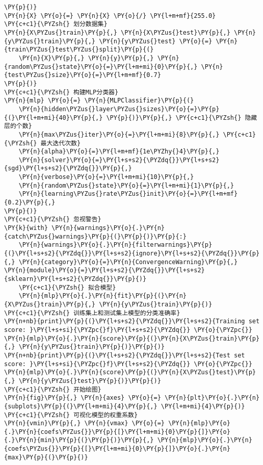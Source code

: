 \begin{Verbatim}[commandchars=\\\{\}]
\PY{p}{)}
\PY{n}{X} \PY{o}{=} \PY{n}{X} \PY{o}{/} \PY{l+m+mf}{255.0}
\PY{c+c1}{\PYZsh{} 划分数据集}
\PY{n}{X\PYZus{}train}\PY{p}{,} \PY{n}{X\PYZus{}test}\PY{p}{,} \PY{n}{y\PYZus{}train}\PY{p}{,} \PY{n}{y\PYZus{}test} \PY{o}{=} \PY{n}{train\PYZus{}test\PYZus{}split}\PY{p}{(}
    \PY{n}{X}\PY{p}{,} \PY{n}{y}\PY{p}{,} \PY{n}{random\PYZus{}state}\PY{o}{=}\PY{l+m+mi}{0}\PY{p}{,} \PY{n}{test\PYZus{}size}\PY{o}{=}\PY{l+m+mf}{0.7}
\PY{p}{)}
\PY{c+c1}{\PYZsh{} 构建MLP分类器}
\PY{n}{mlp} \PY{o}{=} \PY{n}{MLPClassifier}\PY{p}{(}
    \PY{n}{hidden\PYZus{}layer\PYZus{}sizes}\PY{o}{=}\PY{p}{(}\PY{l+m+mi}{40}\PY{p}{,} \PY{p}{)}\PY{p}{,} \PY{c+c1}{\PYZsh{} 隐藏层的个数}
    \PY{n}{max\PYZus{}iter}\PY{o}{=}\PY{l+m+mi}{8}\PY{p}{,} \PY{c+c1}{\PYZsh{} 最大迭代次数}
    \PY{n}{alpha}\PY{o}{=}\PY{l+m+mf}{1e\PYZhy{}4}\PY{p}{,}
    \PY{n}{solver}\PY{o}{=}\PY{l+s+s2}{\PYZdq{}}\PY{l+s+s2}{sgd}\PY{l+s+s2}{\PYZdq{}}\PY{p}{,}
    \PY{n}{verbose}\PY{o}{=}\PY{l+m+mi}{10}\PY{p}{,}
    \PY{n}{random\PYZus{}state}\PY{o}{=}\PY{l+m+mi}{1}\PY{p}{,}
    \PY{n}{learning\PYZus{}rate\PYZus{}init}\PY{o}{=}\PY{l+m+mf}{0.2}\PY{p}{,}
\PY{p}{)}
\PY{c+c1}{\PYZsh{} 忽视警告}
\PY{k}{with} \PY{n}{warnings}\PY{o}{.}\PY{n}{catch\PYZus{}warnings}\PY{p}{(}\PY{p}{)}\PY{p}{:}
    \PY{n}{warnings}\PY{o}{.}\PY{n}{filterwarnings}\PY{p}{(}\PY{l+s+s2}{\PYZdq{}}\PY{l+s+s2}{ignore}\PY{l+s+s2}{\PYZdq{}}\PY{p}{,} \PY{n}{category}\PY{o}{=}\PY{n}{ConvergenceWarning}\PY{p}{,} \PY{n}{module}\PY{o}{=}\PY{l+s+s2}{\PYZdq{}}\PY{l+s+s2}{sklearn}\PY{l+s+s2}{\PYZdq{}}\PY{p}{)}
    \PY{c+c1}{\PYZsh{} 拟合模型}
    \PY{n}{mlp}\PY{o}{.}\PY{n}{fit}\PY{p}{(}\PY{n}{X\PYZus{}train}\PY{p}{,} \PY{n}{y\PYZus{}train}\PY{p}{)}
\PY{c+c1}{\PYZsh{} 训练集上和测试集上模型的分类准确率}
\PY{n+nb}{print}\PY{p}{(}\PY{l+s+s2}{\PYZdq{}}\PY{l+s+s2}{Training set score: }\PY{l+s+si}{\PYZpc{}f}\PY{l+s+s2}{\PYZdq{}} \PY{o}{\PYZpc{}} \PY{n}{mlp}\PY{o}{.}\PY{n}{score}\PY{p}{(}\PY{n}{X\PYZus{}train}\PY{p}{,} \PY{n}{y\PYZus{}train}\PY{p}{)}\PY{p}{)}
\PY{n+nb}{print}\PY{p}{(}\PY{l+s+s2}{\PYZdq{}}\PY{l+s+s2}{Test set score: }\PY{l+s+si}{\PYZpc{}f}\PY{l+s+s2}{\PYZdq{}} \PY{o}{\PYZpc{}} \PY{n}{mlp}\PY{o}{.}\PY{n}{score}\PY{p}{(}\PY{n}{X\PYZus{}test}\PY{p}{,} \PY{n}{y\PYZus{}test}\PY{p}{)}\PY{p}{)}
\PY{c+c1}{\PYZsh{} 开始绘图}
\PY{n}{fig}\PY{p}{,} \PY{n}{axes} \PY{o}{=} \PY{n}{plt}\PY{o}{.}\PY{n}{subplots}\PY{p}{(}\PY{l+m+mi}{4}\PY{p}{,} \PY{l+m+mi}{4}\PY{p}{)}
\PY{c+c1}{\PYZsh{} 可视化模型的权重系数}
\PY{n}{vmin}\PY{p}{,} \PY{n}{vmax} \PY{o}{=} \PY{n}{mlp}\PY{o}{.}\PY{n}{coefs\PYZus{}}\PY{p}{[}\PY{l+m+mi}{0}\PY{p}{]}\PY{o}{.}\PY{n}{min}\PY{p}{(}\PY{p}{)}\PY{p}{,} \PY{n}{mlp}\PY{o}{.}\PY{n}{coefs\PYZus{}}\PY{p}{[}\PY{l+m+mi}{0}\PY{p}{]}\PY{o}{.}\PY{n}{max}\PY{p}{(}\PY{p}{)}

\end{Verbatim}
